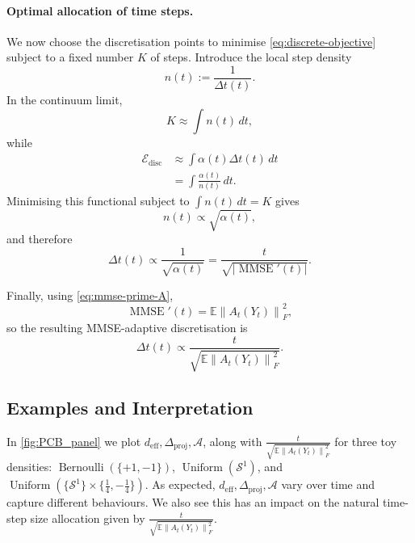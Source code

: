 \documentclass{article}
\newcommand{\deff}{d_{\mathrm{eff}}}
\newcommand{\dproj}{\Delta_{\mathrm{proj}}}
\newcommand{\amb}{\mathcal{A}}
\theoremstyle{plain}
\theoremstyle{definition}
\theoremstyle{remark}
\begin{document}
\paragraph{Optimal allocation of time steps.}
We now choose the discretisation points to minimise
\eqref{eq:discrete-objective} subject to a fixed number $K$ of steps.
Introduce the local step density
\begin{equation}
    n(t) := \frac{1}{\Delta t(t)}.
\end{equation}
In the continuum limit,
\begin{equation}
    K
    \approx
    \int n(t)\,dt,
\end{equation}
while
\begin{equation}
\begin{aligned}
    \mathcal{E}_{\mathrm{disc}}
    &\approx
    \int \alpha(t)\Delta t(t)\,dt
    \\
    &=
    \int \frac{\alpha(t)}{n(t)}\,dt.
\end{aligned}
\end{equation}
Minimising this functional subject to
$\int n(t)\,dt=K$ gives
\begin{equation}
    n(t)\propto \sqrt{\alpha(t)},
\end{equation}
and therefore
\begin{equation}
    \Delta t(t)
    \propto
    \frac{1}{\sqrt{\alpha(t)}}
    =
    \frac{t}{\sqrt{|\operatorname{MMSE}'(t)|}}.
    \label{eq:mmse-schedule}
\end{equation}

Finally, using \autoref{eq:mmse-prime-A},
\begin{equation}
    \operatorname{MMSE}'(t)
    = \mathbb{E}\left\|A_t\left(Y_t\right)\right\|_F^2,
\end{equation}
so the resulting MMSE-adaptive discretisation is
\begin{equation}
    \Delta t(t)
    \propto
    \frac{t}
    {\sqrt{\mathbb{E}\left\|A_t\left(Y_t\right)\right\|_F^2
    }}
    .
    \label{eq:natural-discretisation}
\end{equation}


\subsection{Examples and Interpretation}

In \autoref{fig:PCB_panel} we plot $\deff, \dproj, \amb$, along with $\frac{t}{\sqrt{\mathbb{E}\left\|A_t\left(Y_t\right)\right\|_F^2}}$ for three toy densities: $\operatorname{Bernoulli}(\{+1,-1\})$, $\operatorname{Uniform}(\mathcal{S}^1)$, and $\operatorname{Uniform}(\{\mathcal{S}^1\} \times \{\tfrac{1}{4},-\tfrac{1}{4}\})$. As expected, $\deff, \dproj, \amb$ vary over time and capture different behaviours. We also see this has an impact on the natural time-step size allocation given by $\frac{t}{\sqrt{\mathbb{E}\left\|A_t\left(Y_t\right)\right\|_F^2}}$. 
\end{document}
